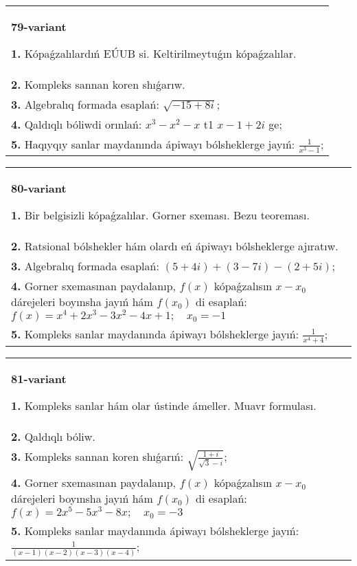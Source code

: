 \documentclass{article}
\begin{document}
\begin{tabular}{m{17cm}}
\textbf{79-variant}
\newline

\textbf{1.} Kópaǵzalılardıń EÚUB si. Keltirilmeytuǵın   kópaǵzalılar. \\
\textbf{2.} Kompleks sannan koren shıǵarıw. \\
\textbf{3.} Algebralıq formada esaplań: $\sqrt{-15+8 i}$; \\
\textbf{4.} Qaldıqlı bóliwdi orınlań:  $x^3-x^2-x$ t1 $x-1+2 i$ ge; \\
\textbf{5.} Haqıyqıy sanlar maydanında ápiwayı bólsheklerge jayıń:  $\frac{1}{x^3-1}$; \\

\end{tabular}
\vspace{1cm}


\begin{tabular}{m{17cm}}
\textbf{80-variant}
\newline

\textbf{1.} Bir belgisizli kópaǵzalılar. Gorner sxeması. Bezu teoreması.  \\
\textbf{2.} Ratsional bólshekler hám olardı eń ápiwayı bólsheklerge ajıratıw. \\
\textbf{3.} Algebralıq formada esaplań: $(5+4 i)+(3-7 i)-(2+5 i)$; \\
\textbf{4.} Gorner sxemasınan paydalanıp, $f(x)$ kópaǵzalısın $x-x_0$ dárejeleri boyınsha jayıń hám $f\left(x_0\right)$ di esaplań: $f(x)=x^4+2 x^3-3 x^2-4 x+1 ; \quad x_0=-1$ \\
\textbf{5.} Kompleks sanlar maydanında ápiwayı bólsheklerge jayıń: $\frac{1}{x^4+4}$; \\

\end{tabular}
\vspace{1cm}


\begin{tabular}{m{17cm}}
\textbf{81-variant}
\newline

\textbf{1.} Kompleks sanlar hám olar ústinde ámeller. Muavr formulası.  \\
\textbf{2.} Qaldıqlı bóliw.  \\
\textbf{3.} Kompleks sannan koren shıǵarıń: $\sqrt{\frac{1+i}{\sqrt{3}-i}}$; \\
\textbf{4.} Gorner sxemasınan paydalanıp, $f(x)$ kópaǵzalısın $x-x_0$ dárejeleri boyınsha jayıń hám $f\left(x_0\right)$ di esaplań: $f(x)=2 x^5-5 x^3-8 x ; \quad x_0=-3$ \\
\textbf{5.} Kompleks sanlar maydanında ápiwayı bólsheklerge jayıń: $\frac{1}{(x-1)(x-2)(x-3)(x-4)}$; \\

\end{tabular}
\vspace{1cm}
\end{document}
